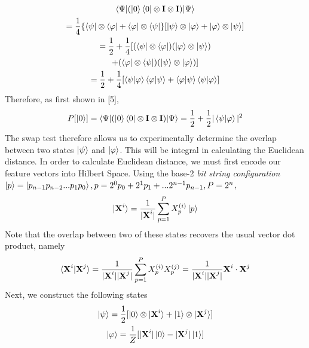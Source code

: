 \documentclass[twocolumn, english]{revtex4-2}
\begin{document}
\begin{equation}\begin{gathered}
\braket{\Psi|(\ket{0}\bra{0}\otimes\textbf{I}\otimes\textbf{I})|\Psi}\\=\frac{1}{4}\{\bra{\psi}\otimes\bra{\varphi}+\bra{\varphi}\otimes\bra{\psi}\}[\ket{\psi}\otimes\ket{\varphi}+\ket{\varphi}\otimes\ket{\psi}]\\
=\frac{1}{2}+\frac{1}{4}[(\bra{\psi}\otimes\bra{\varphi})(\ket{\varphi}\otimes\ket{\psi})\\+(\bra{\varphi}\otimes\bra{\psi})(\ket{\psi}\otimes\ket{\varphi})]\\
=\frac{1}{2}+\frac{1}{4}[\braket{\psi|\varphi}\braket{\varphi|\psi}+\braket{\varphi|\psi}\braket{\psi|\varphi}]
\end{gathered}\end{equation}
Therefore, as first shown in [5],
\begin{equation}
P[\ket{0}] = \braket{\Psi|(\ket{0}\bra{0}\otimes\textbf{I}\otimes\textbf{I})|\Psi} = \frac{1}{2}+\frac{1}{2}|\braket{\psi|\varphi}|^2
\end{equation}
The swap test therefore allows us to experimentally determine the overlap between two states $\ket{\psi}$ and $\ket{\varphi}$. This will be integral in calculating the Euclidean distance. In order to calculate Euclidean distance, we must first encode our feature vectors into Hilbert Space. Using the base-2 \textit{bit string configuration} $\ket{p}=\ket{p_{n-1}p_{n-2}...p_{1}p_{0}}, p=2^{0}p_{0}+2^{1}p_{1}+...2^{n-1}p_{n-1}, P=2^{n}$,
\begin{equation}
\ket{\textbf{X}^i} = \frac{1}{|\textbf{X}^i|}\sum_{p=1}^{P} X_{p}^{(i)}\ket{p}
\end{equation}
Note that the overlap between two of these states recovers the usual vector dot product, namely
\begin{equation}
\braket{\textbf{X}^{i}|\textbf{X}^{j}}=\frac{1}{|\textbf{X}^{i}||\textbf{X}^{j}|}\sum_{p=1}^{P}X_{p}^{(i)}X_{p}^{(j)}=\frac{1}{|\textbf{X}^{i}||\textbf{X}^{j}|}\textbf{X}^{i}\cdot\textbf{X}^{j}
\end{equation}
Next, we construct the following states
\begin{equation}\begin{gathered}
\ket{\psi}=\frac{1}{2}[\ket{0}\otimes\ket{\textbf{X}^{i}}+\ket{1}\otimes\ket{\textbf{X}^{j}}]\\
\ket{\varphi}=\frac{1}{Z}[|\textbf{X}^{i}|\ket{0} - |\textbf{X}^{j}|\ket{1}]
\end{gathered}\end{equation}
\end{document}
